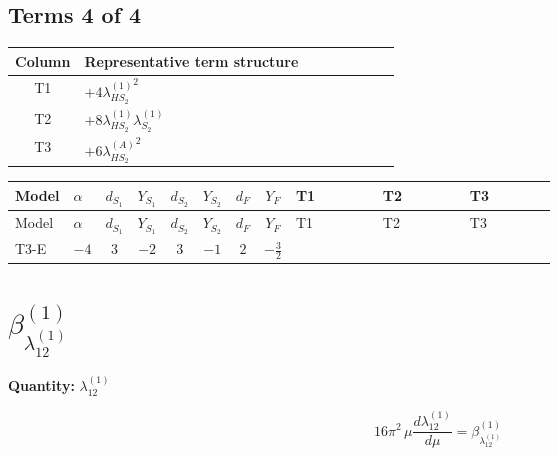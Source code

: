 \documentclass[8pt]{article}
\begin{document}
\begin{landscape}
\subsection*{Terms 4 of 4}
\begin{center}
\begin{tabular}{@{}c >{\raggedright\arraybackslash}p{0.82\linewidth}@{}}
\toprule
Column & Representative term structure \\
\midrule
T1 & \(\displaystyle +4 {\lambda_{HS_2}^{(1)}}^2\) \\
\midrule
T2 & \(\displaystyle +8 {\lambda_{HS_2}^{(1)}} {\lambda_{S_2}^{(1)}}\) \\
\midrule
T3 & \(\displaystyle +6 {\lambda_{HS_2}^{(A)}}^2\) \\
\midrule
\bottomrule
\end{tabular}
\end{center}
\smallskip
\tiny
\begin{longtable}{@{}llcccccc >{\raggedright\arraybackslash}p{0.21\linewidth} >{\raggedright\arraybackslash}p{0.21\linewidth} >{\raggedright\arraybackslash}p{0.21\linewidth}@{}}
\toprule
Model & $\alpha$ & $d_{S_1}$ & $Y_{S_1}$ & $d_{S_2}$ & $Y_{S_2}$ & $d_F$ & $Y_F$ & T1 & T2 & T3 \\
\midrule
\endfirsthead
\toprule
Model & $\alpha$ & $d_{S_1}$ & $Y_{S_1}$ & $d_{S_2}$ & $Y_{S_2}$ & $d_F$ & $Y_F$ & T1 & T2 & T3 \\
\midrule
\endhead
T3-E & $-4$ & $3$ & $-2$ & $3$ & $-1$ & $2$ & $-\frac{3}{2}$ & \scriptsize\adjustbox{max width=\linewidth}{$\begin{gathered} +4 {\lambda_{HS_2}^{(1)}}^2\end{gathered}$} & \scriptsize\adjustbox{max width=\linewidth}{$\begin{gathered} +8 {\lambda_{HS_2}^{(1)}} {\lambda_{S_2}^{(1)}}\end{gathered}$} & \scriptsize\adjustbox{max width=\linewidth}{$\begin{gathered} +6 {\lambda_{HS_2}^{(A)}}^2\end{gathered}$} \\
\midrule
\bottomrule
\end{longtable}
\clearpage
\section*{$\beta_{\lambda_{12}^{(1)}}^{(1)}$}
\noindent\textbf{Quantity: }$\lambda_{12}^{(1)}$\par\smallskip
\[16\pi^2\,\mu\frac{d \lambda_{12}^{(1)}}{d\mu}=\beta_{\lambda_{12}^{(1)}}^{(1)}\]

\end{landscape}
\end{document}
